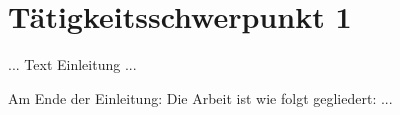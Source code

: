 \chapter{Tätigkeitsschwerpunkt 1}
\label{cha:Einleitung}

... Text Einleitung ...

Am Ende der Einleitung: Die Arbeit ist wie folgt gegliedert: ... 
